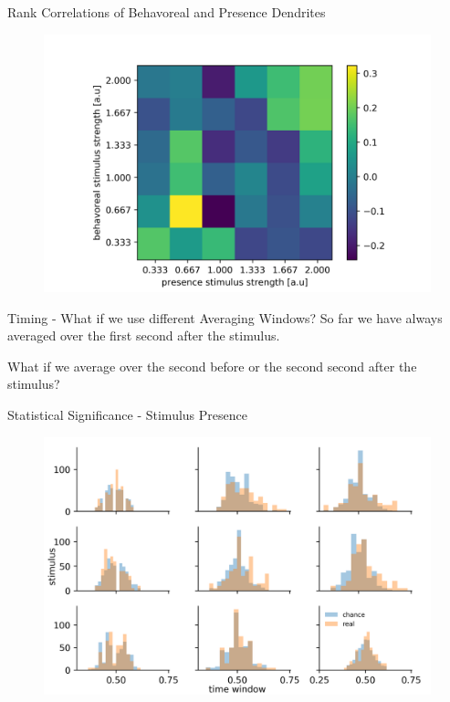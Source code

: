 \documentclass[10pt]{beamer}
\begin{document}
\begin{frame}[fragile]{Rank Correlations of Behavoreal and Presence Dendrites}
\begin{center}
	\begin{figure}
      \includegraphics[width=1.0\textwidth]{transrank.png}
	\end{figure}
	\end{center}
\end{frame}

\begin{frame}[fragile]{Timing - What if we use different Averaging Windows?}
So far we have always averaged over the first second after the stimulus. \newline

What if we average over the second before or the second second after the stimulus?
\end{frame}

\begin{frame}[fragile]{Statistical Significance - Stimulus Presence}
\begin{center}
	\begin{figure}
      \includegraphics[width=1.0\textwidth]{statsig.png}
	\end{figure}
	\end{center}
\end{frame}
\end{document}
